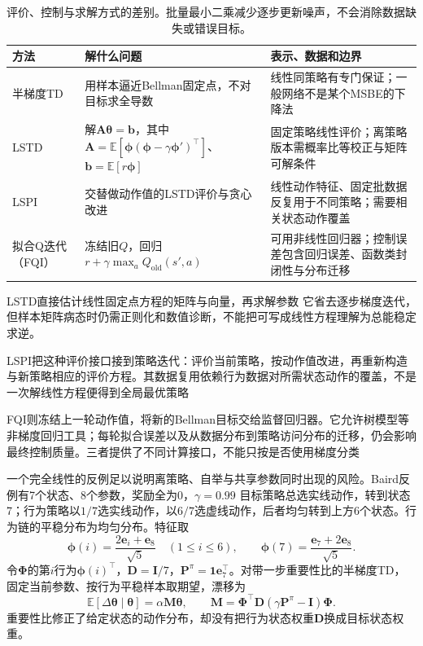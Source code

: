 \begin{table}[t]
  \centering
  \small
  \begin{tabularx}{\linewidth}{>{\raggedright\arraybackslash}p{23mm} >{\raggedright\arraybackslash}X >{\raggedright\arraybackslash}X}
    \toprule
    方法 & 解什么问题 & 表示、数据和边界 \\
    \midrule
    半梯度TD & 用样本逼近Bellman固定点，不对目标求全导数 & 线性同策略有专门保证；一般网络不是某个MSBE的下降法 \\
    LSTD & 解$\bm{A}\bm{\theta}=\bm{b}$，其中$\bm{A}=\mathbb E[\bm{\phi}(\bm{\phi}-\gamma\bm{\phi}')^\top]$、$\bm{b}=\mathbb E[r\bm{\phi}]$ & 固定策略线性评价；离策略版本需概率比等校正与矩阵可解条件 \\
    LSPI & 交替做动作值的LSTD评价与贪心改进 & 线性动作特征、固定批数据反复用于不同策略；需要相关状态动作覆盖 \\
    拟合Q迭代（FQI） & 冻结旧$Q$，回归$r+\gamma\max_aQ_{\mathrm{old}}(s',a)$ & 可用非线性回归器；控制误差包含回归误差、函数类封闭性与分布迁移 \\
    \bottomrule
  \end{tabularx}
  \caption{评价、控制与求解方式的差别。批量最小二乘减少逐步更新噪声，不会消除数据缺失或错误目标。}
  \label{tab:rl-learning-fitted-methods}
\end{table}

LSTD直接估计线性固定点方程的矩阵与向量，再求解参数
它省去逐步梯度迭代，但样本矩阵病态时仍需正则化和数值诊断，不能把可写成线性方程理解为总能稳定求逆。

LSPI把这种评价接口接到策略迭代：评价当前策略，按动作值改进，再重新构造与新策略相应的评价方程。其数据复用依赖行为数据对所需状态动作的覆盖，不是一次解线性方程便得到全局最优策略

FQI则冻结上一轮动作值，将新的Bellman目标交给监督回归器。它允许树模型等非梯度回归工具；每轮拟合误差以及从数据分布到策略访问分布的迁移，仍会影响最终控制质量。三者提供了不同计算接口，不能只按是否使用梯度分类

一个完全线性的反例足以说明离策略、自举与共享参数同时出现的风险。Baird反例有7个状态、8个参数，奖励全为0，$\gamma=0.99$
目标策略总选实线动作，转到状态7；行为策略以$1/7$选实线动作，以$6/7$选虚线动作，后者均匀转到上方6个状态。行为链的平稳分布为均匀分布。特征取
\[
  \bm{\phi}(i)=\frac{2\bm{e}_i+\bm{e}_8}{\sqrt5}\quad(1\leq i\leq6),
  \qquad
  \bm{\phi}(7)=\frac{\bm{e}_7+2\bm{e}_8}{\sqrt5}.
\]
令$\bm{\Phi}$的第$i$行为$\bm{\phi}(i)^\top$，$\bm{D}=\bm{I}/7$，$\bm{P}^\pi=\bm{1}\bm{e}_7^\top$。对带一步重要性比的半梯度TD，固定当前参数、按行为平稳样本取期望，漂移为
\begin{equation}
  \mathbb E[\Delta\bm{\theta}\mid\bm{\theta}]
     =\alpha\bm{M}\bm{\theta},\qquad
  \bm{M}=\bm{\Phi}^\top\bm{D}
                   (\gamma\bm{P}^\pi-\bm{I})\bm{\Phi}.
  \label{eq:rl-learning-baird-matrix}
\end{equation}
重要性比修正了给定状态的动作分布，却没有把行为状态权重$\bm{D}$换成目标状态权重。

